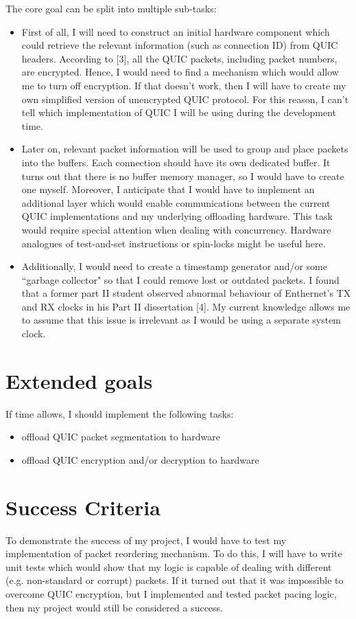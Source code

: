 \documentclass[a4paper,12pt]{article}
\begin{document}
The core goal can be split into multiple sub-tasks:
\begin{itemize}
  \item 
First of all, I will need to construct an initial hardware component which could retrieve the relevant information (such as connection ID) from QUIC headers. 
According to [3], all the QUIC packets, including packet numbers, are encrypted.
Hence, I would need to find a mechanism which would allow me to turn off encryption.
If that doesn't work, then I will have to create my own simplified version of unencrypted QUIC protocol.
For this reason, I can't tell which implementation of QUIC I will be using during the development time.

  \item 
Later on, relevant packet information will be used to group and place packets into the buffers. 
Each connection should have its own dedicated buffer. 
It turns out that there is no buffer memory manager, so I would have to create one myself. 
Moreover, I anticipate that I would have to implement an additional layer which would enable communications between the current QUIC implementations and my underlying offloading hardware. 
This task would require special attention when dealing with concurrency.
Hardware analogues of test-and-set instructions or spin-locks might be useful here.

  \item 
Additionally, I would need to create a timestamp generator and/or some ``garbage collector" so that I could remove lost or outdated packets.
I found that a former part II student observed abnormal behaviour of Enthernet's TX and RX clocks in his Part II dissertation [4].
My current knowledge allows me to assume that this issue is irrelevant as I would be using a separate system clock.
 \end{itemize}

\section*{Extended goals}
 If time allows, I should implement the following tasks:
 \begin{itemize}
  \item offload QUIC packet segmentation to hardware
  \item offload QUIC encryption and/or decryption to hardware
 \end{itemize}

\section*{Success Criteria}
To demonstrate the success of my project, I would have to test my implementation of packet reordering mechanism.
To do this, I will have to write unit tests which would show that my logic is capable of dealing with different (e.g. non-standard or corrupt) packets. 
If it turned out that it was impossible to overcome QUIC encryption, but I implemented and tested packet pacing logic, then my project would still be considered a success.
\end{document}
